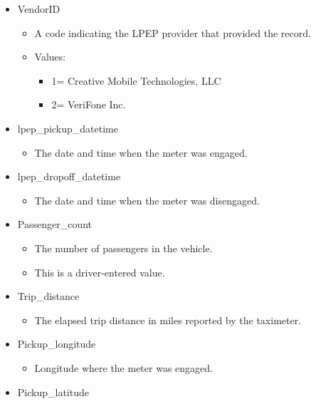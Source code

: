 \documentclass[
  18pt,
  a4paper]{article}
\providecommand{\tightlist}{%
  \setlength{\itemsep}{0pt}\setlength{\parskip}{0pt}}
\begin{document}
\begin{itemize}
\tightlist
\item
  VendorID

  \begin{itemize}
  \tightlist
  \item
    A code indicating the LPEP provider that provided the record.\\
  \item
    Values:

    \begin{itemize}
    \tightlist
    \item
      1= Creative Mobile Technologies, LLC
    \item
      2= VeriFone Inc.\\
    \end{itemize}
  \end{itemize}
\item
  lpep\_pickup\_datetime

  \begin{itemize}
  \tightlist
  \item
    The date and time when the meter was engaged.\\
  \end{itemize}
\item
  lpep\_dropoff\_datetime

  \begin{itemize}
  \tightlist
  \item
    The date and time when the meter was disengaged.\\
  \end{itemize}
\item
  Passenger\_count

  \begin{itemize}
  \tightlist
  \item
    The number of passengers in the vehicle.
  \item
    This is a driver-entered value.\\
  \end{itemize}
\item
  Trip\_distance

  \begin{itemize}
  \tightlist
  \item
    The elapsed trip distance in miles reported by the taximeter.\\
  \end{itemize}
\item
  Pickup\_longitude

  \begin{itemize}
  \tightlist
  \item
    Longitude where the meter was engaged.\\
  \end{itemize}
\item
  Pickup\_latitude


\end{itemize}
\end{document}
